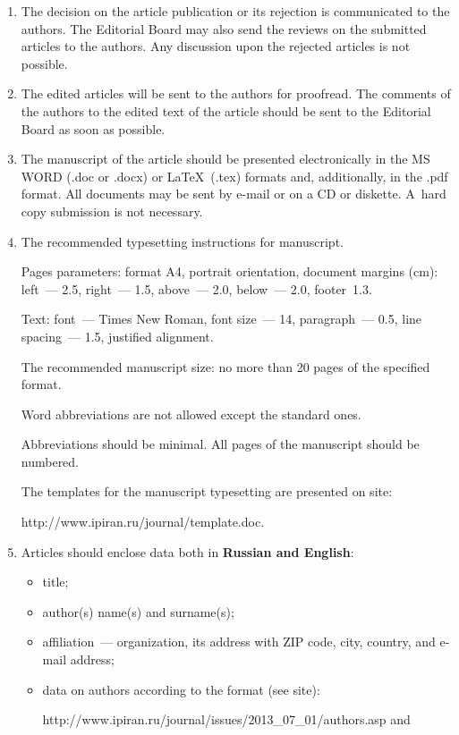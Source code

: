 {\begin{enumerate}[1.]
\item The decision on the article publication or its rejection is communicated to the authors. The Editorial Board may 
also send the reviews on the submitted articles to the authors. Any discussion upon the rejected articles is not possible.

\item The edited articles will be sent to the authors for proofread. The comments of the authors to the edited 
text of the article should be sent to the Editorial Board as soon as possible. 

\item The manuscript of the article should be presented electronically in the MS WORD (.doc or .docx) 
or \LaTeX\ (.tex) formats and, additionally, in the .pdf format. All documents may be sent by e-mail or 
on a CD or diskette. A~hard copy submission is not necessary.

\item The recommended typesetting instructions for manuscript.  

Pages parameters: format A4, portrait orientation, document margins (cm): 
left~--- 2.5, right~--- 1.5, above~--- 2.0, below~--- 2.0, footer~1.3. 

Text: font~--- Times New Roman, font size~--- 14, paragraph~--- 0.5, line spacing~--- 1.5, justified alignment. 
 
The recommended manuscript size: no more than 20 pages of the specified format. 

Word abbreviations are not allowed except the standard ones. 

Abbreviations should be minimal. All pages of the manuscript should be numbered.

The templates for the manuscript typesetting are presented on site: 


{\sf http://www.ipiran.ru/journal/template.doc}.

\item Articles should enclose data both in \textbf{Russian and English}: 
\begin{itemize}
\item title;
\item  author(s) name(s) and surname(s); 
\item affiliation~--- organization, its address with ZIP code, city, country, and e-mail address; 
\item   data on authors according to the format (see site):

{\sf http://www.ipiran.ru/journal/issues/2013\_07\_01/authors.asp}  and


\end{itemize}
\end{enumerate}}
